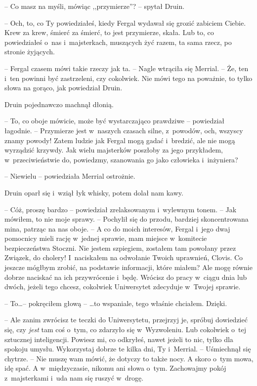 \documentclass[oneside,polish,11pt,sfheadings]{mwbk}
\begin{document}
-- Co masz na myśli, mówiąc ,,przymierze''? -- spytał Druin.

-- Och, to, co Ty powiedziałeś, kiedy Fergal wydawał się grozić zabiciem
Ciebie. Krew za krew, śmierć za śmierć, to jest przymierze, skała. Lub
to, co powiedziałeś o~nas i~majsterkach, muszących żyć razem, ta sama
rzecz, po stronie żyjących.

-- Fergal czasem mówi takie rzeczy jak ta. -- Nagle wtrąciła się Merrial.
-- Że, ten i~ten powinni być zastrzeleni, czy cokolwiek. Nie mówi tego na
poważnie, to tylko słowa na gorąco, jak powiedział Druin.

Druin pojednawczo machnął dłonią. 

-- To, co oboje mówicie, może być
wystarczająco prawdziwe -- powiedział łagodnie. -- Przymierze jest w~naszych czasach silne, z~powodów, och, wszyscy znamy powody! Zatem
ludzie jak Fergal mogą gadać i~bredzić, ale nie mogą wyrządzić krzywdy.
Jak wielu majsterków poszłoby za jego przykładem, w~przeciwieństwie do,
powiedzmy, szanowania go jako człowieka i~inżyniera?

-- Niewielu -- powiedziała Merrial ostrożnie.

Druin oparł się i~wziął łyk whisky, potem dolał nam kawy.

-- Cóż, proszę bardzo -- powiedział zrelaksowanym i~wylewnym tonem. -- Jak
mówiłem, to nie moje sprawy. -- Pochylił się do przodu, bardziej
skoncentrowana mina, patrząc na nas oboje. -- A co do moich interesów,
Fergal i~jego dwaj pomocnicy mieli rację w~jednej sprawie, mam miejsce w~komitecie bezpieczeństwa Stoczni. Nie jestem szpiegiem, zostałem tam
powołany przez Związek, do cholery! I~naciskałem na odwołanie Twoich
uprawnień, Clovis. Co jeszcze mógłbym zrobić, na podstawie informacji,
które miałem? Ale mogę równie dobrze naciskać na ich przywrócenie i~będę. Wrócisz do pracy w~ciągu dnia lub dwóch, jeżeli tego chcesz,
cokolwiek Uniwersytet zdecyduje w~Twojej sprawie.

-- To\ldots -- pokręciłem głową -- \ldots to wspaniale, tego właśnie chciałem.
Dzięki.

-- Ale zanim zwrócisz te teczki do Uniwersytetu, przejrzyj je, spróbuj
dowiedzieć się, czy \textit{jest }tam coś o~tym, co zdarzyło się w~Wyzwoleniu. Lub cokolwiek o~tej sztucznej inteligencji. Powiesz mi, co
odkryłeś, nawet jeżeli to nic, tylko dla spokoju umysłu. Wykorzystaj
dobrze te kilka dni, Ty i~Merrial. -- Uśmiechnął się chytrze. -- Nie muszę
wam mówić, że dotyczy to także nocy. A skoro o~tym mowa, idę spać. A w~międzyczasie, nikomu ani słowa o~tym. Zachowajmy pokój z~majsterkami i~uda nam się ruszyć w~drogę.
\end{document}
